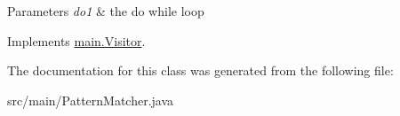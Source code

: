 \begin{DoxyParams}{Parameters}
{\em do1} & the do while loop \\
\hline
\end{DoxyParams}


Implements \hyperlink{interfacemain_1_1_visitor_a9e4bc482c380e7b78c1dc6df1cfa16c2}{main.\+Visitor}.



The documentation for this class was generated from the following file\+:\begin{DoxyCompactItemize}
\item 
src/main/Pattern\+Matcher.\+java\end{DoxyCompactItemize}

